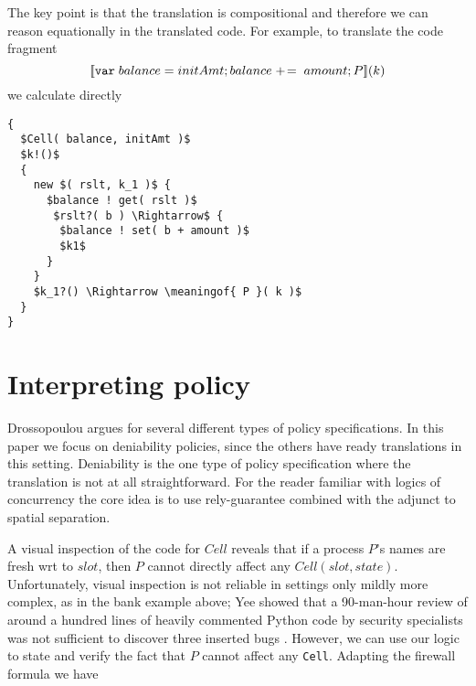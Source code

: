 \documentclass[]{amsart}
\newcommand{\ldb}{[\![}
\newcommand{\rdb}{]\!]}
\newcommand{\meaningof}[1]{\ldb #1 \rdb}
\theoremstyle{definition}
\theoremstyle{remark}
\numberwithin{equation}{subsection}
\begin{document}


The key point is that the translation is compositional and therefore
we can reason equationally in the translated code. For example, to
translate the code fragment 
\[\meaningof{ \mbox{\tt var}\; balance = initAmt; balance\; +\!= \; amount; P }( k )\]
we calculate directly


\begin{lstlisting}[mathescape]
{ 
  $Cell( balance, initAmt )$
  $k!()$
  {
    new $( rslt, k_1 )$ {
      $balance ! get( rslt )$  
       $rslt?( b ) \Rightarrow$ {
        $balance ! set( b + amount )$
        $k1$
      }
    } 
    $k_1?() \Rightarrow \meaningof{ P }( k )$
  }
}
\end{lstlisting}


\section{Interpreting policy}

Drossopoulou \cite{Drossopoulou:2013:NCP:2489804.2489811} argues for several different types of policy
specifications. In this paper we focus on deniability policies, since the
others have ready translations in this setting. Deniability is the one
type of policy specification where the translation is not at all
straightforward. For the reader familiar with logics of concurrency the
core idea is to use rely-guarantee combined with the adjunct to
spatial separation.

A visual inspection of the code for $Cell$ reveals that if a
process $P$’s names are fresh wrt to $slot$, then $P$ cannot
directly affect any $Cell( slot, state )$. Unfortunately, 
visual inspection is not reliable in settings only mildly more 
complex, as in the bank example above; Yee showed that a 90-man-hour
review of around a hundred lines of heavily commented Python code 
by security specialists was not sufficient to discover three 
inserted bugs \cite[Section 7]{Pvote}. 
However, we can use our logic to state and verify the fact that $P$
cannot affect any {\tt Cell}. Adapting the firewall formula we have
\end{document}
